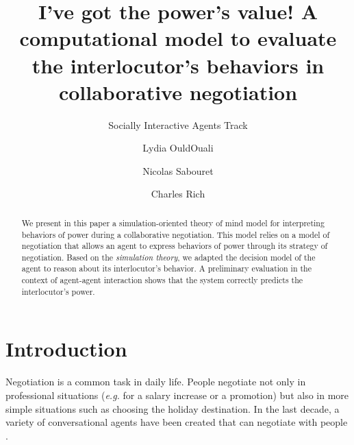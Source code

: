 \documentclass[sigconf]{aamas}  %
\begin{document}
	\title{I've got the power's value! A computational model to evaluate the interlocutor's behaviors in collaborative negotiation}  %
	
	\subtitle{Socially Interactive Agents Track}
	
	
	
	
	\author{Lydia OuldOuali}
	
	\author{Nicolas Sabouret}
	
	
	\author{Charles Rich}
	
	
	
	\begin{abstract}  %
		We present in this paper a simulation-oriented theory of mind model for interpreting behaviors of power during a collaborative negotiation. This model relies on a model of negotiation that allows an agent to express behaviors of power through its strategy of negotiation. Based on the \emph{simulation theory}, we adapted the decision model of the agent to reason about its interlocutor's behavior. A preliminary evaluation in the context of agent-agent interaction shows that the system correctly predicts the interlocutor's power.
	\end{abstract}
	
	
	
	\maketitle
	
	
	\section{Introduction}
	
	Negotiation is a common task in daily life. People negotiate not only in professional situations (\emph{e.g.} for a salary increase or a promotion) but also in more simple situations such as choosing the holiday destination. In the last decade, a variety of conversational agents have been created that can negotiate with people \cite{pynadath2013you,gratch2016misrepresentation,klatt2011negotiations}.
	
\end{document}

